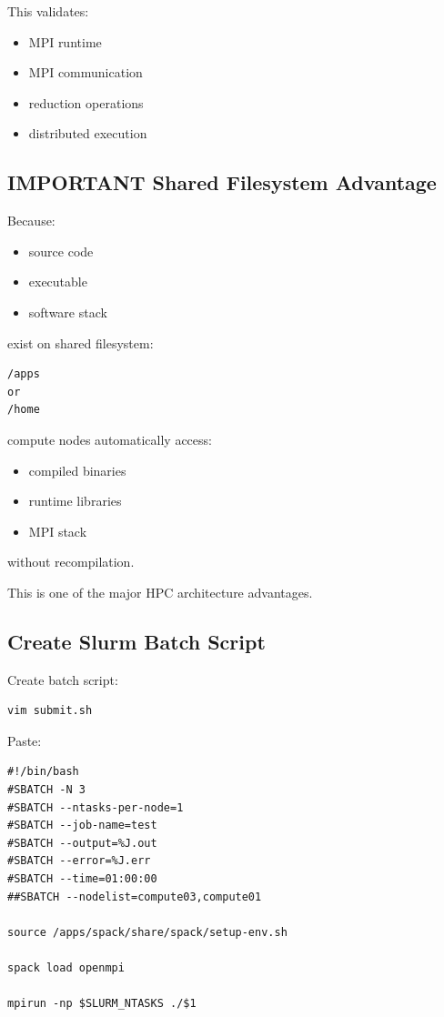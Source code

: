 \documentclass[11pt]{article}
\begin{document}
This validates:

\begin{itemize}
\item MPI runtime
\item MPI communication
\item reduction operations
\item distributed execution
\end{itemize}
\subsection{IMPORTANT Shared Filesystem Advantage}
\label{sec:orga329c99}

Because:

\begin{itemize}
\item source code
\item executable
\item software stack
\end{itemize}

exist on shared filesystem:

\begin{verbatim}
/apps
or
/home
\end{verbatim}

compute nodes automatically access:

\begin{itemize}
\item compiled binaries
\item runtime libraries
\item MPI stack
\end{itemize}

without recompilation.

This is one of the major HPC architecture advantages.
\subsection{Create Slurm Batch Script}
\label{sec:orgd689085}

Create batch script:

\begin{verbatim}
vim submit.sh
\end{verbatim}

Paste:

\begin{verbatim}
#!/bin/bash
#SBATCH -N 3
#SBATCH --ntasks-per-node=1
#SBATCH --job-name=test
#SBATCH --output=%J.out
#SBATCH --error=%J.err
#SBATCH --time=01:00:00
##SBATCH --nodelist=compute03,compute01

source /apps/spack/share/spack/setup-env.sh

spack load openmpi

mpirun -np $SLURM_NTASKS ./$1
\end{verbatim}
\end{document}
